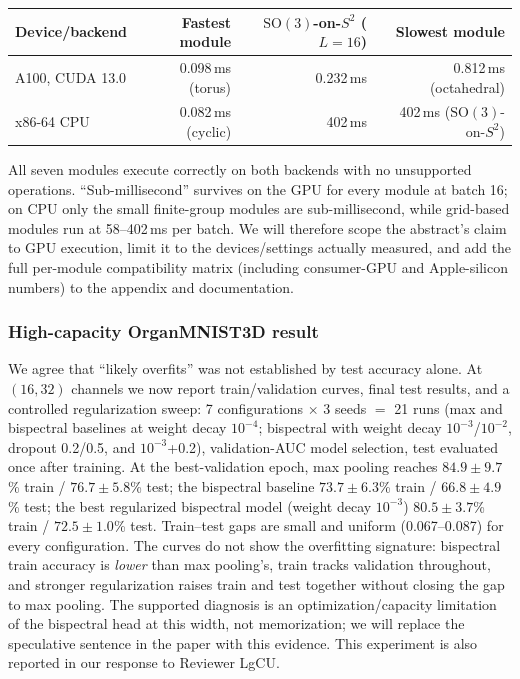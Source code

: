 \documentclass[10pt]{article}
\begin{document}
\begin{center}
\begin{tabular}{lrrr}
\toprule
Device/backend & Fastest module & $\mathrm{SO}(3)$-on-$S^2$ ($L=16$) & Slowest module \\
\midrule
A100, CUDA 13.0 & 0.098\,ms (torus)  & 0.232\,ms & 0.812\,ms (octahedral) \\
x86-64 CPU      & 0.082\,ms (cyclic) & 402\,ms   & 402\,ms ($\mathrm{SO}(3)$-on-$S^2$) \\
\bottomrule
\end{tabular}
\end{center}

All seven modules execute correctly on both backends with no unsupported
operations. ``Sub-millisecond'' survives on the GPU for every module at batch
16; on CPU only the small finite-group modules are sub-millisecond, while
grid-based modules run at 58--402\,ms per batch. We will therefore scope the
abstract's claim to GPU execution, limit it to the devices/settings actually
measured, and add the full per-module compatibility matrix (including
consumer-GPU and Apple-silicon numbers) to the appendix and documentation.

\subsubsection*{High-capacity OrganMNIST3D result}

We agree that ``likely overfits'' was not established by test accuracy alone.
At $(16,32)$ channels we now report train/validation curves, final test
results, and a controlled regularization sweep: 7 configurations $\times$ 3
seeds $=$ 21 runs (max and bispectral baselines at weight decay $10^{-4}$;
bispectral with weight decay $10^{-3}$/$10^{-2}$, dropout 0.2/0.5, and
$10^{-3}$+0.2), validation-AUC model selection, test evaluated once after
training. At the best-validation epoch, max pooling reaches $84.9\pm9.7$\%
train / $76.7\pm5.8$\% test; the bispectral baseline $73.7\pm6.3$\% train /
$66.8\pm4.9$\% test; the best regularized bispectral model (weight decay
$10^{-3}$) $80.5\pm3.7$\% train / $72.5\pm1.0$\% test. Train--test gaps are
small and uniform (0.067--0.087) for every configuration. The curves do not
show the overfitting signature: bispectral train accuracy is \emph{lower}
than max pooling's, train tracks validation throughout, and stronger
regularization raises train and test together without closing the gap to max
pooling. The supported diagnosis is an optimization/capacity limitation of
the bispectral head at this width, not memorization; we will replace the
speculative sentence in the paper with this evidence. This experiment is also
reported in our response to Reviewer LgCU.
\end{document}
